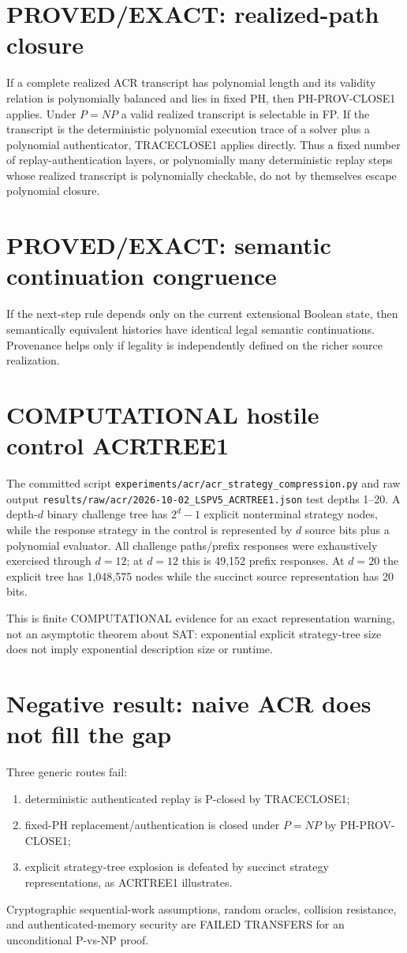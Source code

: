 \documentclass[11pt]{article}
\begin{document}
\section*{PROVED/EXACT: realized-path closure}
If a complete realized ACR transcript has polynomial length and its validity relation is polynomially balanced and lies in fixed PH, then PH-PROV-CLOSE1 applies. Under $P=NP$ a valid realized transcript is selectable in FP. If the transcript is the deterministic polynomial execution trace of a solver plus a polynomial authenticator, TRACECLOSE1 applies directly. Thus a fixed number of replay-authentication layers, or polynomially many deterministic replay steps whose realized transcript is polynomially checkable, do not by themselves escape polynomial closure.

\section*{PROVED/EXACT: semantic continuation congruence}
If the next-step rule depends only on the current extensional Boolean state, then semantically equivalent histories have identical legal semantic continuations. Provenance helps only if legality is independently defined on the richer source realization.

\section*{COMPUTATIONAL hostile control ACRTREE1}
The committed script \texttt{experiments/acr/acr\_strategy\_compression.py} and raw output \texttt{results/raw/acr/2026-10-02\_LSPV5\_ACRTREE1.json} test depths 1--20. A depth-$d$ binary challenge tree has $2^d-1$ explicit nonterminal strategy nodes, while the response strategy in the control is represented by $d$ source bits plus a polynomial evaluator. All challenge paths/prefix responses were exhaustively exercised through $d=12$; at $d=12$ this is 49,152 prefix responses. At $d=20$ the explicit tree has 1,048,575 nodes while the succinct source representation has 20 bits.

This is finite COMPUTATIONAL evidence for an exact representation warning, not an asymptotic theorem about SAT: exponential explicit strategy-tree size does not imply exponential description size or runtime.

\section*{Negative result: naive ACR does not fill the gap}
Three generic routes fail:
\begin{enumerate}
\item deterministic authenticated replay is P-closed by TRACECLOSE1;
\item fixed-PH replacement/authentication is closed under $P=NP$ by PH-PROV-CLOSE1;
\item explicit strategy-tree explosion is defeated by succinct strategy representations, as ACRTREE1 illustrates.
\end{enumerate}
Cryptographic sequential-work assumptions, random oracles, collision resistance, and authenticated-memory security are FAILED TRANSFERS for an unconditional P-vs-NP proof.
\end{document}
